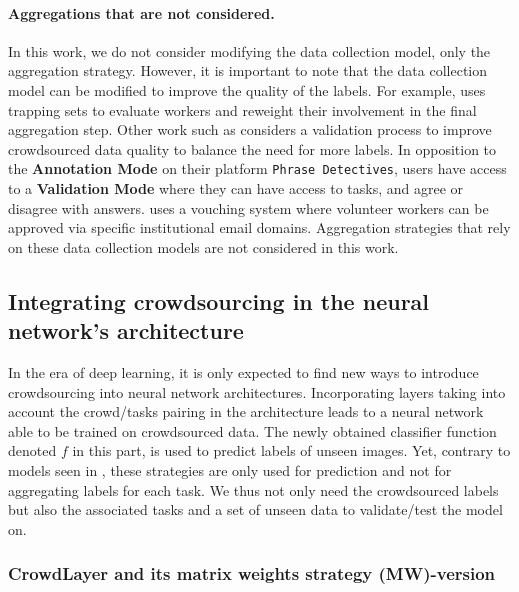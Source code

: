 \paragraph*{Aggregations that are not considered.}
In this work, we do not consider modifying the data collection model, only the aggregation strategy.
However, it is important to note that the data collection model can be modified to improve the quality of the labels.
For example, \citet{khattak_toward_2017} uses trapping sets to evaluate workers and reweight their involvement in the final aggregation step.
Other work such as \citet{chamberlain2018optimising} considers a validation process to improve crowdsourced data quality to balance the need for more labels. In opposition to the \textbf{Annotation Mode} on their platform \texttt{Phrase Detectives}, users have access to a \textbf{Validation Mode} where they can have access to tasks, and agree or disagree with answers.
\citet{hoang2021tournesol} uses a vouching system where volunteer workers can be approved via specific institutional email domains.
Aggregation strategies that rely on these data collection models are not considered in this work.

\subsection{Integrating crowdsourcing in the neural network's architecture}
In the era of deep learning, it is only expected to find new ways to introduce crowdsourcing into neural network architectures.
Incorporating layers taking into account the crowd/tasks pairing in the architecture leads to a neural network able to be trained on crowdsourced data.
The newly obtained classifier function denoted $f$ in this part, is used to predict labels of unseen images.
Yet, contrary to models seen in , these strategies are only used for prediction and not for aggregating labels for each task.
We thus not only need the crowdsourced labels but also the associated tasks and a set of unseen data to validate/test the model on.

\subsubsection{CrowdLayer and its matrix weights strategy (MW)-version}
\label{subsec:crowdlayer}

